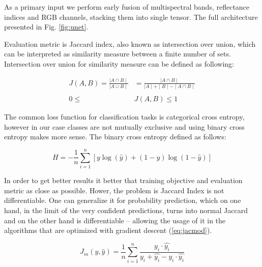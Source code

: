 \documentclass[10pt,twocolumn,letterpaper]{article}
\begin{document}
As a primary input we perform early fusion of multispectral bands, reflectance indices and RGB channels, stacking them into single tensor. The full architecture presented in Fig. \ref{fig:unet}.



Evaluation metric is Jaccard index, also known as intersection over union, which can be interpreted as similarity  measure between a finite number of sets. Intersection over union for similarity measure can be defined as following: 
 
\begin{equation}
\begin{aligned}
J(A, B) = \frac{\mid A \cap B \mid }{\mid A \cup B \mid} &= \frac{\mid A \cap B \mid}{\mid A \mid + \mid B \mid - \mid A \cap B \mid} \\ \\ 
0 \le & J(A, B) \le 1
\end{aligned}
\end{equation}

The common loss function for classification tasks is categorical cross entropy, however in our case classes are not mutually exclusive and using binary cross entropy makes more sense. The binary cross entropy defined as follows:
 
\begin{equation} \label{eq:bintropy}
H = -\frac{1}{n}\sum_{i=1}^n{[y \log(\widehat{y})+(1-y)\log(1-\widehat{y})]}
\end{equation}

In order to get better results it better that training objective and evaluation metric as close as possible. Hower, the problem is  Jaccard Index is not differentiable. One can generalize it for probability prediction, which on one hand, in the limit of the very confident predictions, turns into normal Jaccard and on the other hand is differentiable – allowing the usage of it in the algorithms that are optimized with gradient descent (\ref{eq:jacmod}). 

\begin{equation} \label{eq:jacmod}
J_{m}(y, \widehat{y}) = \frac{1}{n} \sum_{i=1}^n \frac{y_i \cdot \widehat{y_i}}{y_i + \widehat{y_i} - y_i \cdot \widehat{y_i}}
\end{equation}
\end{document}
